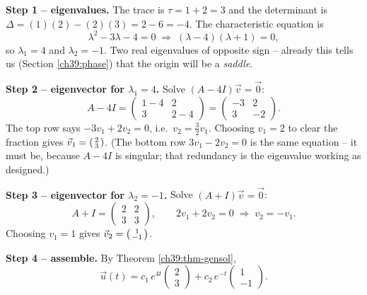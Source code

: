 \textbf{Step 1 -- eigenvalues.} The trace is $\tau = 1 + 2 = 3$ and the
determinant is $\Delta = (1)(2) - (2)(3) = 2 - 6 = -4$. The characteristic
equation is
\[
  \lambda^2 - 3\lambda - 4 = 0 \;\Longrightarrow\; (\lambda - 4)(\lambda + 1) = 0,
\]
so $\lambda_1 = 4$ and $\lambda_2 = -1$. Two real eigenvalues of opposite sign --
already this tells us (Section \ref{ch39:phase}) that the origin will be a
\emph{saddle}.

\textbf{Step 2 -- eigenvector for $\lambda_1 = 4$.} Solve $(A - 4I)\vec v = \vec
0$:
\[
  A - 4I = \begin{pmatrix} 1-4 & 2 \\ 3 & 2-4 \end{pmatrix}
         = \begin{pmatrix} -3 & 2 \\ 3 & -2 \end{pmatrix}.
\]
The top row says $-3v_1 + 2v_2 = 0$, i.e.\ $v_2 = \tfrac{3}{2}v_1$. Choosing
$v_1 = 2$ to clear the fraction gives
$\vec v_1 = \begin{psmallmatrix} 2 \\ 3\end{psmallmatrix}$. (The bottom row
$3v_1 - 2v_2 = 0$ is the same equation -- it must be, because $A-4I$ is singular;
that redundancy is the eigenvalue working as designed.)

\textbf{Step 3 -- eigenvector for $\lambda_2 = -1$.} Solve $(A + I)\vec v = \vec
0$:
\[
  A + I = \begin{pmatrix} 2 & 2 \\ 3 & 3 \end{pmatrix},
  \qquad 2v_1 + 2v_2 = 0 \;\Longrightarrow\; v_2 = -v_1.
\]
Choosing $v_1 = 1$ gives
$\vec v_2 = \begin{psmallmatrix} 1 \\ -1\end{psmallmatrix}$.

\textbf{Step 4 -- assemble.} By Theorem \ref{ch39:thm-gensol},
\[
  \vec u(t)
   = c_1\,e^{4t}\begin{pmatrix} 2 \\ 3 \end{pmatrix}
   + c_2\,e^{-t}\begin{pmatrix} 1 \\ -1 \end{pmatrix}.
\]

